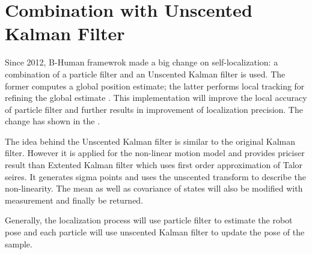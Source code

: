 \section{Combination with Unscented Kalman Filter}
Since 2012, B-Human framewrok made a big change on self-localization: a combination of a particle filter and an Unscented Kalman filter is used.
The former computes a global position estimate; the latter performs local tracking for refining the global estimate \cite{BHumanCodeRelease2012}. 
This implementation will improve the local accuracy of particle filter and further results in improvement of localization precision. The change has shown in the . 

The idea behind the Unscented Kalman filter is similar to the original Kalman filter. However it is applied for the non-linear motion model and provides priciser result than Extented Kalman filter which uses first order approximation of Talor seires. It generates sigma points and uses the unscented transform to describe the non-linearity. The mean as well as covariance of states will also be modified with measurement and finally be returned. 

Generally, the localization process will use particle filter to estimate the robot pose and each particle will use unscented Kalman filter to update the pose of the sample.

